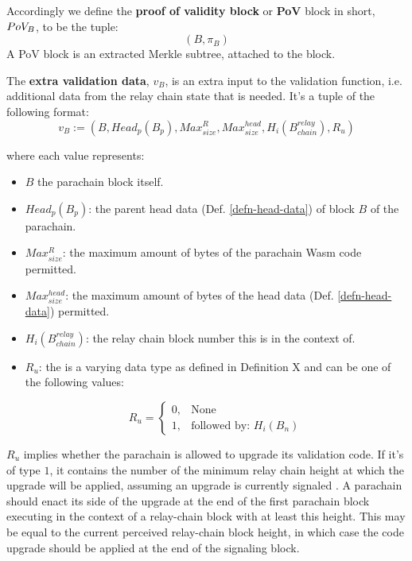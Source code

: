 \begin{definition}
  \label{defn-pov-block}
  Accordingly we define the {\bf proof of validity block} or {\bf PoV} block in
  short, {\bf $PoV_B$}, to be the tuple:
  \[
  (B, \pi_B)
  \]
  A PoV block is an extracted Merkle subtree, attached to the block.
\end{definition}

\begin{definition}  \label{defn-extra-validation-data}
  The \textbf{extra validation data}, $v_B$, is an extra input to the validation
  function, i.e. additional data from the relay chain state that is needed.
  It's a tuple of the following format:
  \[
  v_B := (B, Head_p(B_p), Max^{R}_{size}, Max^{head}_{size}, H_i(B^{relay}_{chain}), R_u)
  \]

  where each value represents:

  \begin{itemize}
    \item $B$ the parachain block itself.
    \item $Head_p(B_p)$: the parent head data (Def. \ref{defn-head-data}) of
    block $B$ of the parachain.
    \item $Max^{R}_{size}$: the maximum amount of bytes of the parachain Wasm
    code permitted.
    \item $Max^{head}_{size}$: the maximum amount of bytes of the head data
    (Def. \ref{defn-head-data}) permitted.
    \item $H_i(B^{relay}_{chain})$: the relay chain block number this is in the
    context of.
    \item $R_u$: the  is a varying data type as defined in Definition X
     and can be one of the following values:

    \begin{equation*}
      R_u =
      \begin{cases}
        0, & \text{None} \\
        1, & \text{followed by: } H_i(B_n)
      \end{cases}
    \end{equation*}
  \end{itemize}

  $R_u$ implies whether the parachain is allowed to upgrade its validation code.
  If it's of type $1$, it contains the number of the minimum relay chain height
  at which the upgrade will be applied, assuming an upgrade is currently
  signaled . A parachain should enact its
  side of the upgrade at the end of the first parachain block executing in the
  context of a relay-chain block with at least this height. This may be equal to
  the current perceived relay-chain block height, in which case the code upgrade
  should be applied at the end of the signaling block.
  \newline


\end{definition}
